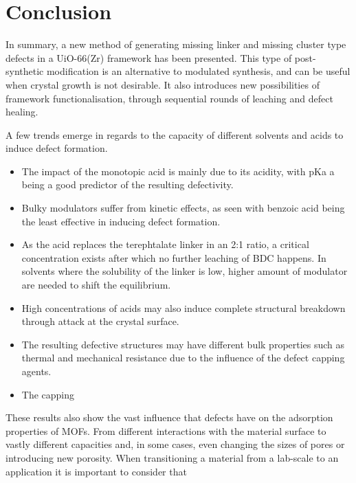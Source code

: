 
\FloatBarrier%
\pagebreak

\section{Conclusion}

In summary, a new method of generating missing linker and missing
cluster type defects in a UiO-66(Zr) framework has been presented.
This type of post-synthetic modification is an alternative to 
modulated synthesis, and can be useful when crystal growth is
not desirable. It also introduces new possibilities of framework
functionalisation, through sequential rounds of leaching and 
defect healing.

A few trends emerge in regards to the capacity of different solvents 
and acids to induce defect formation.

\begin{itemize}
    \item The impact of the monotopic acid is mainly due to its 
    acidity, with pKa a being a good predictor of the 
    resulting defectivity.
    \item Bulky modulators suffer from kinetic effects, as seen
    with benzoic acid being the least effective in inducing 
    defect formation.
    \item As the acid replaces the
    terephtalate linker in an 2:1 ratio, a critical
    concentration exists after which no further leaching of 
    BDC happens. In solvents where the solubility of 
    the linker is low, higher amount of modulator are 
    needed to shift the equilibrium.
    \item High concentrations of acids may also induce complete 
    structural breakdown through attack at the crystal surface.
    \item The resulting defective structures may have different 
    bulk properties such as thermal and mechanical resistance due 
    to the influence of the defect capping agents.
    \item The capping 

\end{itemize}

These results also show the vast influence that defects have on the 
adsorption properties of MOFs. From different interactions with 
the material surface to vastly different capacities and, in some 
cases, even changing the sizes of pores or introducing new porosity.
When transitioning a material from a lab-scale to an application
it is important to consider that 